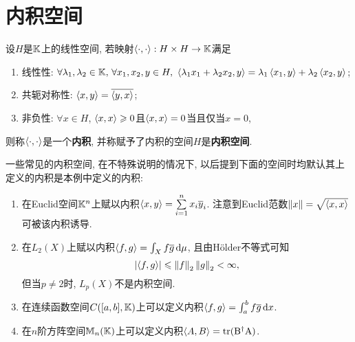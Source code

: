\section{内积空间}

\begin{Definition}[内积空间]
	设$ H $是$ \mathbb{K} $上的线性空间, 若映射$ \left\langle \cdot,\cdot \right\rangle : H\times H\to\mathbb{K} $满足
	\begin{enumerate}[(1)]
		\item 线性性: $ \forall \lambda_1,\lambda_2\in\K,\,\forall x_1,x_2,y\in H,\ \lrangle{\lambda_1x_1+\lambda_2x_2,y}=\lambda_1\lrangle{x_1,y}+\lambda_2\lrangle{x_2,y} $;
		\item 共轭对称性: $ \left\langle x,y \right\rangle=\overline{\left\langle y,x \right\rangle} $;
		\item 非负性: $ \forall x\in H $, $ \left\langle x,x \right\rangle\geqslant 0 $且$ \left\langle x,x \right\rangle=0 $当且仅当$ x=0 $,
	\end{enumerate}
	则称$ \left\langle \cdot,\cdot \right\rangle $是一个\textbf{内积}, 并称赋予了内积的空间$ H $是\textbf{内积空间}.
\end{Definition}

\begin{Example}
	一些常见的内积空间, 在不特殊说明的情况下, 以后提到下面的空间时均默认其上定义的内积是本例中定义的内积:
	\begin{enumerate}[(1)]
		\item 在Euclid空间$ \mathbb{K}^n $上赋以内积$ \left\langle x,y \right\rangle=\sum\limits_{i=1}^nx_i\overline{y}_i $. 注意到Euclid范数$ \left\| x \right\|=\sqrt{\left\langle x,x \right\rangle} $可被该内积诱导.
		\item 在$ L_2(X) $上赋以内积$ \left\langle f,g \right\rangle=\int_Xf\overline{g}\,\mathrm{d}\mu $, 且由H\"older不等式可知
		      \[
			      \left| \left\langle f,g \right\rangle \right| \leqslant\left\| f \right\|_2\left\| g \right\|_2<\infty,
		      \]
		      但当$ p\ne 2 $时, $ L_p(X) $不是内积空间.
		\item 在连续函数空间$ C([a,b],\mathbb{K}) $上可以定义内积$ \left\langle f,g \right\rangle=\int_a^bf\overline{g}\,\mathrm{d} x $.
		\item 在$ n $阶方阵空间$ \mathbb{M}_n(\mathbb{K}) $上可以定义内积$ \left\langle A,B \right\rangle=\mathrm{tr(B^\dagger A)} $.
	\end{enumerate}
\end{Example}

